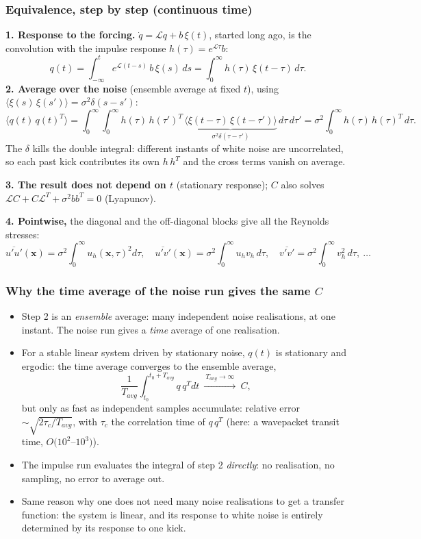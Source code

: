\documentclass[
  aspectratio=169,
  t,
  onlytextwidth,
  10pt,
]{beamer}
\begin{document}
\begin{frame}
	\frametitle{Equivalence, step by step (continuous time)}
	\small
	\textbf{1. Response to the forcing.} $\dot q=\mathcal{L}q+b\,\xi(t)$, started long ago, is the convolution with the impulse response $h(\tau)=e^{\mathcal{L}\tau}b$:
	\[
		q(t)=\int_{-\infty}^{t} e^{\mathcal{L}(t-s)}\,b\,\xi(s)\,ds=\int_0^\infty h(\tau)\,\xi(t-\tau)\,d\tau .
	\]
	\textbf{2. Average over the noise} (ensemble average at fixed $t$), using $\langle\xi(s)\,\xi(s')\rangle=\sigma^2\delta(s-s')$:
	\[
		\langle q(t)\,q(t)^T\rangle=\int_0^\infty\!\!\int_0^\infty h(\tau)\,h(\tau')^T\,\underbrace{\langle\xi(t-\tau)\,\xi(t-\tau')\rangle}_{\sigma^2\delta(\tau-\tau')}\,d\tau\,d\tau'
		=\sigma^2\int_0^\infty h(\tau)\,h(\tau)^T\,d\tau .
	\]
	The $\delta$ kills the double integral: different instants of white noise are uncorrelated, so each past kick contributes its own $h\,h^T$ and the cross terms vanish on average.

	\textbf{3. The result does not depend on $t$} (stationary response); $C$ also solves $\mathcal{L}C+C\mathcal{L}^T+\sigma^2bb^T=0$ (Lyapunov).

	\textbf{4. Pointwise,} the diagonal and the off-diagonal blocks give all the Reynolds stresses:
	\[
		\overline{u'u'}(\mathbf{x})=\sigma^2\!\int_0^\infty u_h(\mathbf{x},\tau)^2d\tau,\quad
		\overline{u'v'}(\mathbf{x})=\sigma^2\!\int_0^\infty u_h v_h\,d\tau,\quad
		\overline{v'v'}=\sigma^2\!\int_0^\infty v_h^2\,d\tau,\ \dots
	\]
\end{frame}

\begin{frame}
	\frametitle{Why the time average of the noise run gives the same $C$}
	\small
	\begin{itemize}
		\item Step 2 is an \emph{ensemble} average: many independent noise realisations, at one instant. The noise run gives a \emph{time} average of one realisation.
		\item For a stable linear system driven by stationary noise, $q(t)$ is stationary and ergodic: the time average converges to the ensemble average,
		      \[
			      \frac{1}{T_{avg}}\int_{t_0}^{t_0+T_{avg}} q\,q^T dt \ \xrightarrow{\ T_{avg}\to\infty\ }\ C ,
		      \]
		      but only as fast as independent samples accumulate: relative error $\sim\sqrt{2\tau_c/T_{avg}}$, with $\tau_c$ the correlation time of $q\,q^T$ (here: a wavepacket transit time, $O(10^2$--$10^3)$).
		\item The impulse run evaluates the integral of step 2 \emph{directly}: no realisation, no sampling, no error to average out.
		\item Same reason why one does not need many noise realisations to get a transfer function: the system is linear, and its response to white noise is entirely determined by its response to one kick.
	\end{itemize}
\end{frame}
\end{document}
